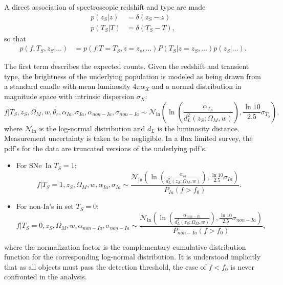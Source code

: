 \documentclass[preprint,3p]{elsarticle}
\begin{document}
A direct association of spectroscopic redshift and type are made
\begin{align}
p(z_S|z) &= \delta(z_S-z)\\
p(T_S|T) &= \delta(T_S-T),
\label{specz:eqn}
\end{align}
so that
\begin{align}
p(f, {{T}}_S,{{z}}_S|  \ldots) &= 
p(f| T=T_S, z=z_s,\dots) P(T_S| z= z_S , \ldots) p(z_S|\ldots).
\label{obs:eqn}
\end{align}


The first term describes the expected counts. Given the redshift
and transient type, the brightness of the underlying population
is modeled as being drawn from a standard candle
with mean luminosity $4\pi\alpha_X$ and a normal distribution in magnitude
space with intrinsic dispersion  $\sigma_X$:
\begin{equation}
f| T_S, z_S, \Omega_M, w, \theta_r, \alpha_{Ia},\sigma_{Ia}, \alpha_{\mathit{non-Ia}},\sigma_{\mathit{non-Ia}} \sim \mathcal{N}_{\ln}\left(\ln{\left(\frac{\alpha_{T_S}}{d_L^2(z_S;\Omega_M, w)}\right)}, \frac{\ln{10}}{2.5}\sigma_{T_S}\right),
\label{flux:eqn}
\end{equation}
where $\mathcal{N}_{\ln}$ is the log-normal distribution and $d_L$ is the luminosity distance.
Measurement uncertainty is taken to be negligible.
In a flux limited survey, the pdf's for the data are truncated versions of the underlying
pdf's.
\begin{itemize}
\item For SNe~Ia  $T_S=1$:
\begin{equation}
f | T_S=1, z_S, \Omega_M, w, \alpha_{Ia},\sigma_{Ia} \sim
\frac{\mathcal{N}_{\ln}\left(\ln{\left(\frac{\alpha_{Ia}}{d_L^2(z_S;\Omega_M, w)}\right)}, \frac{\ln{10}}{2.5}\sigma_{Ia}\right)}{P_{Ia}(f > f_0)}.
\label{adusnIa:eqn}
\end{equation}
\item For non-Ia's in set $T_S=0$:
\begin{equation}
f | T_S=0, z_S, \Omega_M, w, \alpha_{\mathit{non-Ia}},\sigma_{\mathit{non-Ia}}\sim 
\frac{\mathcal{N}_{\ln}\left(\ln{\left(\frac{\alpha_{\mathit{non-Ia}}}{d_L^2(z_S;\Omega_M, w)}\right)}, \frac{\ln{10}}{2.5}\sigma_{\mathit{non-Ia}}\right)}{P_{non-Ia}(f > f_0)},
\label{adunonIa:eqn}
\end{equation}
\end{itemize}
where the normalization factor is the complementary cumulative distribution function
for the corresponding log-normal distribution.
It is understood implicitly that as all objects must pass the detection threshold,
the case of $f<f_0$ is never confronted in the analysis.
\end{document}
